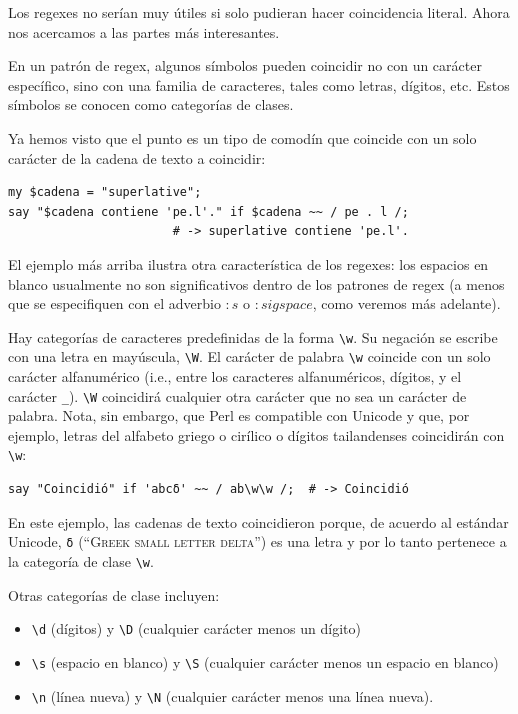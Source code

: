 Los regexes no serían muy útiles si solo pudieran hacer 
coincidencia literal. Ahora nos acercamos a las partes más 
interesantes.

En un patrón de regex, algunos símbolos pueden coincidir no
con un carácter específico, sino con una familia de caracteres,
tales como letras, dígitos, etc. Estos símbolos se conocen como
categorías de clases.

Ya hemos visto que el punto es un tipo de comodín que
coincide con un solo carácter de la cadena de texto a
coincidir:

\begin{verbatim}
my $cadena = "superlative";
say "$cadena contiene 'pe.l'." if $cadena ~~ / pe . l /;
                       # -> superlative contiene 'pe.l'.
\end{verbatim}
%

El ejemplo más arriba ilustra otra característica
de los regexes: los espacios en blanco usualmente
no son significativos dentro de los patrones de regex 
(a menos que se especifiquen con el adverbio 
$:s$ o $:sigspace$, como veremos más adelante).

Hay categorías de caracteres predefinidas de la forma \verb|\w|.
Su negación se escribe con una letra en mayúscula, \verb|\W|.
El carácter de palabra \verb|\w| coincide con un solo carácter 
alfanumérico (i.e., entre los caracteres alfanuméricos, dígitos,
y el carácter \verb|_|). \verb|\W| coincidirá cualquier otra carácter
que no sea un carácter de palabra. Nota, sin embargo, que Perl
es compatible con Unicode y que, por ejemplo, letras del alfabeto
griego o cirílico o dígitos tailandenses coincidirán con \verb|\w|:

\begin{verbatim}
say "Coincidió" if 'abcδ' ~~ / ab\w\w /;  # -> Coincidió
\end{verbatim}
%

En este ejemplo, las cadenas de texto coincidieron porque, de 
acuerdo al estándar Unicode, \verb|δ| (``\textsc{Greek small letter delta}'')
es una letra y por lo tanto pertenece a la categoría de  
clase \verb|\w|.

Otras categorías de clase incluyen:
\begin{itemize}
\item \verb|\d| (dígitos) y \verb|\D| (cualquier carácter menos un dígito)
\item \verb|\s| (espacio en blanco) y \verb|\S| (cualquier carácter menos un espacio en blanco)
\item \verb|\n| (línea nueva) y \verb|\N| (cualquier carácter menos una línea nueva).
\end{itemize}

